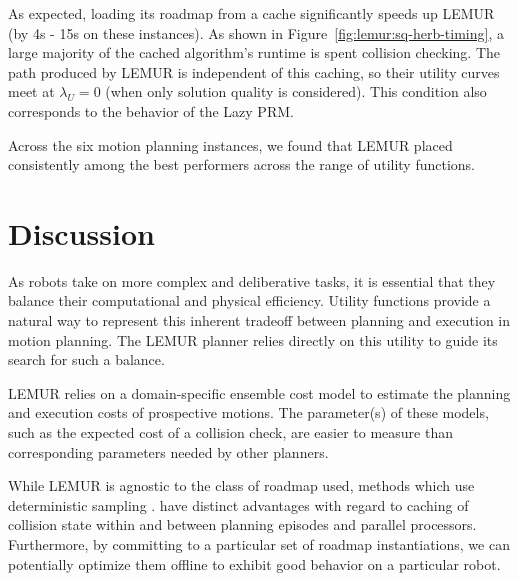 As expected,
loading its roadmap from a cache
significantly speeds up LEMUR (by 4s - 15s on these instances).
As shown in Figure~\ref{fig:lemur:sq-herb-timing},
a large majority of the cached algorithm's runtime is spent
collision checking.
The path produced by LEMUR is independent of this caching,
so their utility curves meet at $\lambda_U = 0$
(when only solution quality is considered).
This condition also corresponds to the behavior of the Lazy PRM.

Across the six motion planning instances,
we found that LEMUR placed consistently among the best performers
across the range of utility functions.

\section{Discussion}
\label{sec:discussion}

As robots take on more complex and deliberative tasks,
it is essential that they balance their computational and
physical efficiency.
Utility functions provide a natural way to represent this
inherent tradeoff between planning and execution
in motion planning.
The LEMUR planner relies directly on this utility
to guide its search for such a balance.

LEMUR relies on a domain-specific ensemble cost model to
estimate the planning and execution costs of prospective motions.
The parameter(s) of these models,
such as the expected cost of a collision check,
are easier to measure than corresponding parameters needed by
other planners.


While LEMUR is agnostic to the class of roadmap used,
methods which use deterministic sampling
\citep{lavalle2004deterministic, janson2015deterministicsampling}.
have distinct advantages with regard to caching of collision state
within and between planning episodes and parallel processors.
Furthermore,
by committing to a particular set of roadmap instantiations,
we can potentially optimize them offline \citep{salzman2014sparsification}
to exhibit good behavior on a particular robot.



